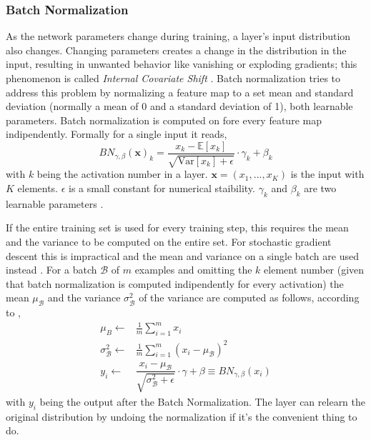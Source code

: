 \subsubsection{Batch Normalization}
As the network parameters change during training, a layer's input distribution also changes. Changing parameters creates a change in the distribution in the input, resulting in unwanted behavior like vanishing or exploding gradients; this phenomenon is called \textit{Internal Covariate Shift} \citep{Ioffe2015BatchShift}.
Batch normalization tries to address this problem by normalizing a feature map to a set mean and standard deviation (normally a mean of 0 and a standard deviation of 1), both learnable parameters. Batch normalization is computed on fore every feature map indipendently. Formally for a single input it reads,
\begin{equation}
    BN_{\gamma,\beta}(\bm{x})_k = \dfrac{x_k - \mathbb{E}[x_k]}{\sqrt{\text{Var}[x_k]+\epsilon}} \cdot \gamma_k + \beta_k
\end{equation}
with $k$ being the activation number in a layer. $\bm{x} = (x_1, ..., x_K)$ is the input with $K$ elements. $\epsilon$ is a small constant for numerical staibility. $\gamma_k$ and $\beta_k$ are two learnable parameters \citep{Ioffe2015BatchShift}. 

If the entire training set is used for every training step, this requires the mean and the variance to be computed on the entire set. For stochastic gradient descent this is impractical and the mean and variance on a single batch are used instead \citep{Ioffe2015BatchShift}. For a batch $\mathcal{B}$ of $m$ examples and omitting the $k$ element number (given that batch normalization is computed indipendently for every activation) the mean $\mu_\mathcal{B}$ and the variance $\sigma^2_\mathcal{B}$ of the variance are computed as follows, according to \citet{Ioffe2015BatchShift},
\begin{align}
    \mu_B \leftarrow & \frac{1}{m} \sum_{i=1}^m x_i \\
    \sigma^2_{\mathcal{B}} \leftarrow & \frac{1}{m} \sum_{i=1}^m (x_i - \mu_\mathcal{B})^2 \\
    y_i \leftarrow & \dfrac{x_i-\mu_\mathcal{B}}{\sqrt{\sigma_\mathcal{B}^2 + \epsilon}} \cdot \gamma + \beta \equiv BN_{\gamma,\beta}(x_i)
\end{align}
with $y_i$ being the output after the Batch Normalization.
The layer can relearn the original distribution by undoing the normalization if it's the convenient thing to do.

